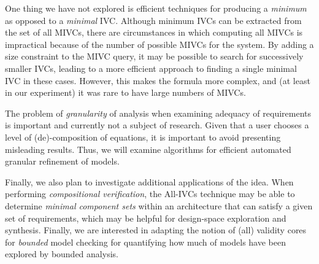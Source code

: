 One thing we have not explored is efficient techniques for producing a {\em minimum} as opposed to a {\em minimal} IVC.  Although minimum IVCs can be extracted from the set of all MIVCs, there are circumstances in which computing all MIVCs is impractical because of the number of possible MIVCs for the system.  By adding a size constraint to the MIVC query, it may be possible to search for successively smaller IVCs, leading to a more efficient approach to finding a single minimal IVC in these cases.  However, this makes the formula more complex, and (at least in our experiment) it was rare to have large numbers of MIVCs.

The problem of {\em granularity} of analysis when examining adequacy of requirements is important and currently not a subject of research.  Given that a user chooses a level of (de)-composition of equations, it is important to avoid presenting misleading results.  Thus, we will examine algorithms for efficient automated granular refinement of models.

Finally, we also plan to investigate additional applications of the idea.  When performing {\em compositional verification}, the All-IVCs technique may be able to determine {\em minimal component sets} within an architecture that can satisfy a given set of requirements, which may be helpful for design-space exploration and synthesis. Finally, we are interested in adapting the notion of (all) validity cores for \emph{bounded} model checking for quantifying how much of models have been explored by bounded analysis. 